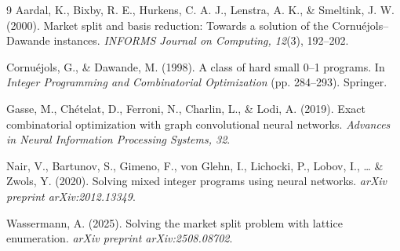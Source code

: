 \documentclass[12pt]{article}
\begin{document}
\begin{thebibliography}{9}
Aardal, K., Bixby, R. E., Hurkens, C. A. J., Lenstra, A. K., \& Smeltink, J. W. (2000). Market split and basis reduction: Towards a solution of the Cornu\'ejols--Dawande instances. \emph{INFORMS Journal on Computing, 12}(3), 192--202.

Cornu\'ejols, G., \& Dawande, M. (1998). A class of hard small 0--1 programs. In \emph{Integer Programming and Combinatorial Optimization} (pp. 284--293). Springer.

Gasse, M., Ch\'etelat, D., Ferroni, N., Charlin, L., \& Lodi, A. (2019). Exact combinatorial optimization with graph convolutional neural networks. \emph{Advances in Neural Information Processing Systems, 32}.

Nair, V., Bartunov, S., Gimeno, F., von Glehn, I., Lichocki, P., Lobov, I., \ldots{} \& Zwols, Y. (2020). Solving mixed integer programs using neural networks. \emph{arXiv preprint arXiv:2012.13349}.

Wassermann, A. (2025). Solving the market split problem with lattice enumeration. \emph{arXiv preprint arXiv:2508.08702}.
\end{thebibliography}
\end{document}
